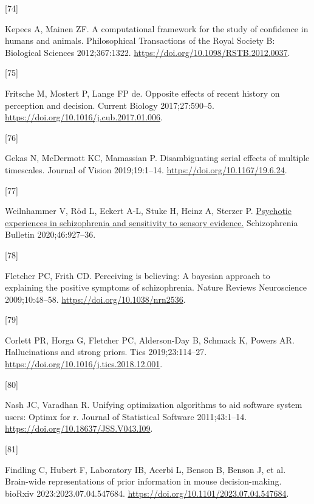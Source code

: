 \documentclass[
]{article}
\newlength{\cslhangindent}
\newlength{\csllabelwidth}
\newlength{\cslentryspacingunit} %
\newenvironment{CSLReferences}[2] %
 {%
  \setlength{\parindent}{0pt}
  \ifodd #1
  \let\oldpar\par
  \def\par{\hangindent=\cslhangindent\oldpar}
  \fi
  \setlength{\parskip}{#2\cslentryspacingunit}
 }%
 {}
\newcommand{\CSLLeftMargin}[1]{\parbox[t]{\csllabelwidth}{#1}}
\newcommand{\CSLRightInline}[1]{\parbox[t]{\linewidth - \csllabelwidth}{#1}\break}
\begin{document}
\begin{CSLReferences}{0}{0}
\leavevmode{}%
\CSLLeftMargin{{[}74{]} }%
\CSLRightInline{Kepecs A, Mainen ZF. A computational framework for the
study of confidence in humans and animals. Philosophical Transactions of
the Royal Society B: Biological Sciences 2012;367:1322.
\url{https://doi.org/10.1098/RSTB.2012.0037}.}

\leavevmode{}%
\CSLLeftMargin{{[}75{]} }%
\CSLRightInline{Fritsche M, Mostert P, Lange FP de. Opposite effects of
recent history on perception and decision. Current Biology
2017;27:590--5. \url{https://doi.org/10.1016/j.cub.2017.01.006}.}

\leavevmode{}%
\CSLLeftMargin{{[}76{]} }%
\CSLRightInline{Gekas N, McDermott KC, Mamassian P. Disambiguating
serial effects of multiple timescales. Journal of Vision 2019;19:1--14.
\url{https://doi.org/10.1167/19.6.24}.}

\leavevmode{}%
\CSLLeftMargin{{[}77{]} }%
\CSLRightInline{Weilnhammer V, Röd L, Eckert A-L, Stuke H, Heinz A,
Sterzer P. \href{https://www.ncbi.nlm.nih.gov/pubmed/32090246}{Psychotic
experiences in schizophrenia and sensitivity to sensory evidence.}
Schizophrenia Bulletin 2020;46:927--36.}

\leavevmode{}%
\CSLLeftMargin{{[}78{]} }%
\CSLRightInline{Fletcher PC, Frith CD. Perceiving is believing: A
bayesian approach to explaining the positive symptoms of schizophrenia.
Nature Reviews Neuroscience 2009;10:48--58.
\url{https://doi.org/10.1038/nrn2536}.}

\leavevmode{}%
\CSLLeftMargin{{[}79{]} }%
\CSLRightInline{Corlett PR, Horga G, Fletcher PC, Alderson-Day B,
Schmack K, Powers AR. Hallucinations and strong priors. Tics
2019;23:114--27. \url{https://doi.org/10.1016/j.tics.2018.12.001}.}

\leavevmode{}%
\CSLLeftMargin{{[}80{]} }%
\CSLRightInline{Nash JC, Varadhan R. Unifying optimization algorithms to
aid software system users: Optimx for r. Journal of Statistical Software
2011;43:1--14. \url{https://doi.org/10.18637/JSS.V043.I09}.}

\leavevmode{}%
\CSLLeftMargin{{[}81{]} }%
\CSLRightInline{Findling C, Hubert F, Laboratory IB, Acerbi L, Benson B,
Benson J, et al. Brain-wide representations of prior information in
mouse decision-making. bioRxiv 2023:2023.07.04.547684.
\url{https://doi.org/10.1101/2023.07.04.547684}.}

\end{CSLReferences}
\end{document}
